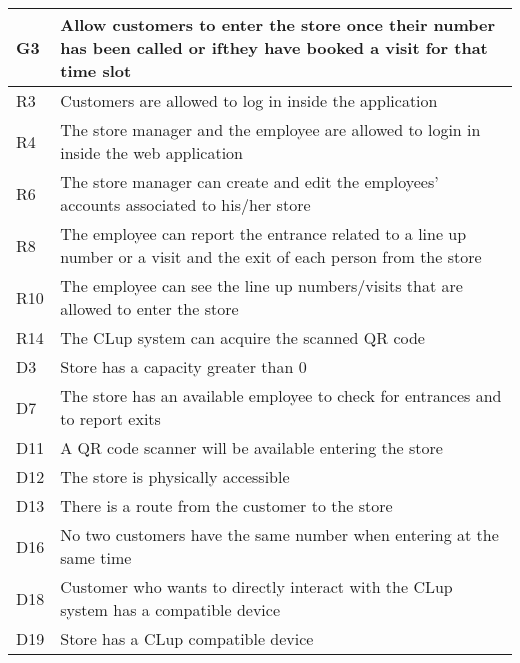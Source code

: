 \begin{center}
        {\renewcommand{\arraystretch}{1.5}
        \begin{longtable}{L{2cm}L{12cm}}
            \hline
            \textbf{G3} & \textbf{Allow customers to enter the store once their number has been called or ifthey have booked a visit for that time slot} \\
            \hline
             R3 & Customers are allowed to log in inside the application \\
            \hline
             R4 & The store manager and the employee are allowed to login in inside the web application \\
            \hline
             R6 & The store manager can create and edit the employees’ accounts associated to his/her store \\
            \hline
             R8 & The employee can report the entrance related to a line up number or a visit and the exit of each person from the store \\
            \hline
             R10 & The employee can see the line up numbers/visits that are allowed to enter the store \\
            \hline
             R14 & The CLup system can acquire the scanned QR code \\
            \hline
             D3 & Store has a capacity greater than 0 \\
            \hline
             D7 & The store has an available employee to check for entrances and to report exits \\
            \hline
             D11 & A QR code scanner will be available entering the store \\
            \hline
             D12 & The store is physically accessible \\
            \hline
             D13 & There is a route from the customer to the store \\
            \hline
             D16 & No two customers have the same number when entering at the same time \\
            \hline
             D18 & Customer who wants to directly interact with the CLup system has a compatible device \\
            \hline
             D19 & Store has a CLup compatible device \\
            \hline
        \end{longtable}}


\end{center}
